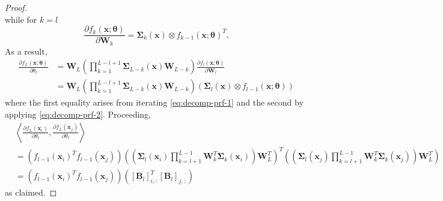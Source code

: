 \documentclass{article}
\theoremstyle{definition}
\def\vtheta{{\bm{\theta}}}
\def\vx{{\bm{x}}}
\def\mB{{\bm{B}}}
\def\mW{{\bm{W}}}
\def\mSigma{{\bm{\Sigma}}}
\begin{document}
\begin{proof}
\begin{equation}
    \end{equation}
    while for $k=l$
    \begin{equation} \label{eq:decomp-prf-2}
         \frac{\partial f_{k}(\vx; \vtheta)}{ \partial \mW_k } = \mSigma_k(\vx) \otimes f_{k-1}(\vx; \vtheta)^T.
    \end{equation}
    As a result,
    \begin{align*}
        \frac{\partial f_L(\vx; \vtheta)}{\partial \theta_l } &=  \mW_L\left(\prod_{k = 1}^{L-l + 1} \mSigma_{L-k}(\vx) \mW_{L-k} \right) \frac{\partial f_{l}(\vx; \vtheta)}{ \partial \mW_l }\\
        &= \mW_L\left(\prod_{k = 1}^{L-l + 1} \mSigma_{L-k}(\vx) \mW_{L-k} \right) \left(\mSigma_l(\vx) \otimes f_{l-1}(\vx; \vtheta)\right)
    \end{align*}
    where the first equality arises from iterating \eqref{eq:decomp-prf-1} and the second by applying \eqref{eq:decomp-prf-2}. Proceeding,
    \begin{align*}
        &\left \langle  \frac{\partial f_L(\vx_i)}{\partial \theta_l }, \frac{\partial f_L(\vx_j)}{\partial \theta_l } \right \rangle \\
        &= \left( f_{l-1}(\vx_i)^T f_{l-1}(\vx_j) \right) \left( \left(\mSigma_l(\vx_i) \prod_{k = l+1}^{L-1} \mW_{k}^T \mSigma_{k}(\vx_i)  \right) \mW_L^T \right)^T \left(\left( \mSigma_l(\vx_j) \prod_{k = l+1}^{L-1} \mW_{k}^T \mSigma_{k}(\vx_j) \right) \mW_L^T \right) \\
        &= \left( f_{l-1}(\vx_i)^T f_{l-1}(\vx_j) \right) \left( [\mB_{l}]_{i,:}^T [\mB_{l}]_{j,:} \right)
    \end{align*}
    as claimed.
\end{proof}
\end{document}
